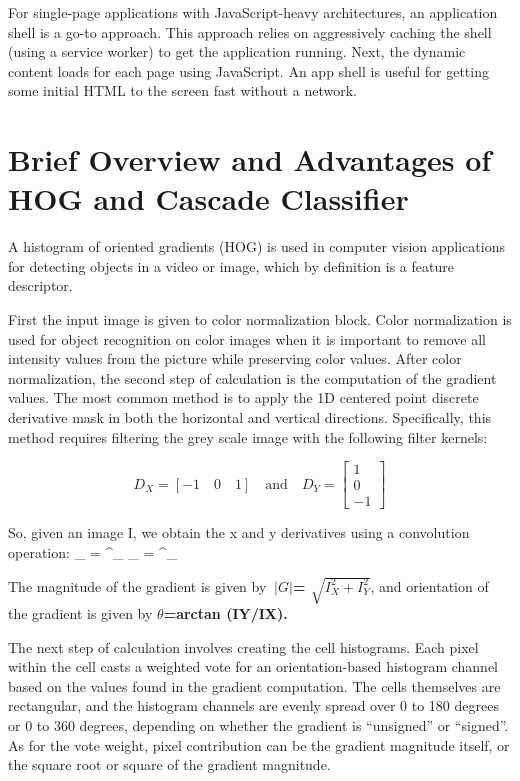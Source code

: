 \documentclass[14pt,a4paper,final]{extreport}
\begin{document}
For single-page applications with JavaScript-heavy architectures, an application shell is a go-to approach. This approach relies on aggressively caching the shell (using a service worker) to get the application running. Next, the dynamic content loads for each page using JavaScript. An app shell is useful for getting some initial HTML to the screen fast without a network.




\chapter{Brief Overview and Advantages of HOG and Cascade Classifier}
\item A histogram of oriented gradients (HOG) is used in computer vision applications for detecting objects in a video or image, which by definition is a feature descriptor.
\item First the input image is given to color normalization block. Color normalization is used for object recognition on color images when it is important to remove all intensity values from the picture while preserving color values. After color normalization, the second step of calculation is the computation of the gradient values. The most common method is to apply the 1D centered point discrete derivative mask in both the horizontal and vertical directions. Specifically, this method requires filtering the grey scale image with the following filter kernels:

\begin{equation*} D_{X}=[-1\quad 0\quad 1]\quad \text {and}\quad D_{Y}=\left [{\begin{array}{c} 1\\ 0\\ -1 \end{array}}\right ] \end{equation*}

\item So, given an image I, we obtain the x and y derivatives using a convolution operation: 
\newline
{}_{} =  ^\ast {}_{}
\newline
{}_{} =  ^\ast {}_{}

\item The magnitude of the gradient is given by
\textbf{$\ |G|$= $\sqrt{I^{2}_{X}+I^{2}_{Y}}$},
\newline and orientation of the gradient is given by \textbf{$\theta$=arctan (IY/IX).}
\item The next step of calculation involves creating the cell histograms. Each pixel within the cell casts a weighted vote for an orientation-based histogram channel based on the values found in the gradient computation. 
\newpage The cells themselves are rectangular, and the histogram channels are evenly spread over 0 to 180 degrees or 0 to 360 degrees, depending on whether the gradient is “unsigned” or “signed”. As for the vote weight, pixel contribution can be the gradient magnitude itself, or the square root or square of the gradient magnitude.
\end{document}

